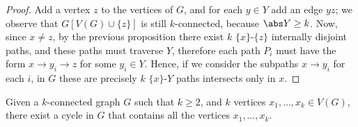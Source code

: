 \documentclass[a4paper, 12pt]{report}
\begin{document}
    \begin{proof}
        Add a vertex $z$ to the vertices of $G$, and for each $y \in Y$ add an edge $yz$; we observe that $G[V(G) \cup \{z\}]$ is still $k$-connected, because $\abs Y \ge k$. Now, since $x \neq z$, by the previous proposition there exist $k$ $\{x\}$-$\{z\}$ internally disjoint paths, and these paths must traverse $Y$, therefore each path $P_i$ must have the form $x \to y_i \to z$ for some $y_i \in Y$. Hence, if we consider the subpaths $x \to y_i$ for each $i$, in $G$ these are precisely $k$ $\{x\}$-$Y$ paths intersects only in $x$.
    \end{proof}

    \begin{framedthm}{}
        Given a $k$-connected graph $G$ such that $k \ge 2$, and $k$ vertices $x_1, \ldots, x_k \in V(G)$, there exist a cycle in $G$ that contains all the vertices $x_1, \ldots, x_k$.
    \end{framedthm}
    
\end{document}
